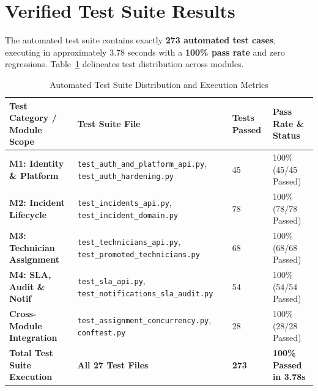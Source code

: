 \documentclass[11pt,a4paper,oneside]{report}
\begin{document}
\section{Verified Test Suite Results}
\label{sec:test_results}
The automated test suite contains exactly \textbf{273 automated test cases}, executing in approximately 3.78 seconds with a \textbf{100\% pass rate} and zero regressions. Table~\ref{tab:test_distribution} delineates test distribution across modules.

\begin{table}[H]
\centering
\small
\caption{Automated Test Suite Distribution and Execution Metrics}
\label{tab:test_distribution}
\begin{tabular}{p{4.5cm}p{3.5cm}p{2.0cm}p{3.5cm}}
\toprule
\textbf{Test Category / Module Scope} & \textbf{Test Suite File} & \textbf{Tests Passed} & \textbf{Pass Rate \& Status} \\
\midrule
\textbf{M1: Identity \& Platform} & \texttt{test\_auth\_and\_platform\_api.py}, \texttt{test\_auth\_hardening.py} & 45 & 100\% (45/45 Passed) \\
\addlinespace
\textbf{M2: Incident Lifecycle} & \texttt{test\_incidents\_api.py}, \texttt{test\_incident\_domain.py} & 78 & 100\% (78/78 Passed) \\
\addlinespace
\textbf{M3: Technician Assignment} & \texttt{test\_technicians\_api.py}, \texttt{test\_promoted\_technicians.py} & 68 & 100\% (68/68 Passed) \\
\addlinespace
\textbf{M4: SLA, Audit \& Notif} & \texttt{test\_sla\_api.py}, \texttt{test\_notifications\_sla\_audit.py} & 54 & 100\% (54/54 Passed) \\
\addlinespace
\textbf{Cross-Module Integration} & \texttt{test\_assignment\_concurrency.py}, \texttt{conftest.py} & 28 & 100\% (28/28 Passed) \\
\midrule
\textbf{Total Test Suite Execution} & \textbf{All 27 Test Files} & \textbf{273} & \textbf{100\% Passed in 3.78s} \\
\bottomrule
\end{tabular}
\end{table}
\end{document}

